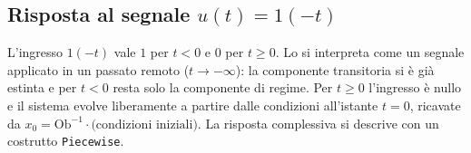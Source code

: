 \subsection{Risposta al segnale $u(t)=1(-t)$}
L'ingresso $1(-t)$ vale $1$ per $t<0$ e $0$ per $t\ge0$. Lo si interpreta come un segnale
applicato in un passato remoto ($t\to-\infty$): la componente transitoria si è già
estinta e per $t<0$ resta solo la componente di regime. Per $t\ge0$ l'ingresso è nullo e
il sistema evolve liberamente a partire dalle condizioni all'istante $t=0$, ricavate da
$x_0=\mathrm{Ob}^{-1}\cdot\text{(condizioni iniziali)}$. La risposta complessiva si
descrive con un costrutto \texttt{Piecewise}.

